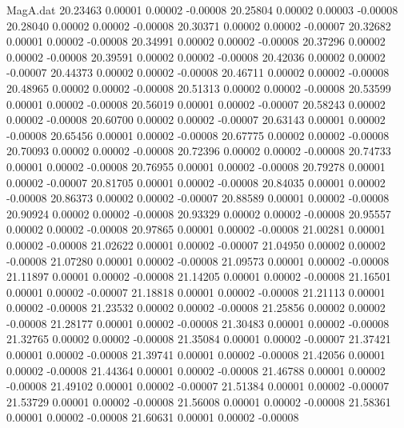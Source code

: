 \begin{filecontents}{MagA.dat}
  20.23463    0.00001    0.00002   -0.00008
  20.25804    0.00002    0.00003   -0.00008
  20.28040    0.00002    0.00002   -0.00008
  20.30371    0.00002    0.00002   -0.00007
  20.32682    0.00001    0.00002   -0.00008
  20.34991    0.00002    0.00002   -0.00008
  20.37296    0.00002    0.00002   -0.00008
  20.39591    0.00002    0.00002   -0.00008
  20.42036    0.00002    0.00002   -0.00007
  20.44373    0.00002    0.00002   -0.00008
  20.46711    0.00002    0.00002   -0.00008
  20.48965    0.00002    0.00002   -0.00008
  20.51313    0.00002    0.00002   -0.00008
  20.53599    0.00001    0.00002   -0.00008
  20.56019    0.00001    0.00002   -0.00007
  20.58243    0.00002    0.00002   -0.00008
  20.60700    0.00002    0.00002   -0.00007
  20.63143    0.00001    0.00002   -0.00008
  20.65456    0.00001    0.00002   -0.00008
  20.67775    0.00002    0.00002   -0.00008
  20.70093    0.00002    0.00002   -0.00008
  20.72396    0.00002    0.00002   -0.00008
  20.74733    0.00001    0.00002   -0.00008
  20.76955    0.00001    0.00002   -0.00008
  20.79278    0.00001    0.00002   -0.00007
  20.81705    0.00001    0.00002   -0.00008
  20.84035    0.00001    0.00002   -0.00008
  20.86373    0.00002    0.00002   -0.00007
  20.88589    0.00001    0.00002   -0.00008
  20.90924    0.00002    0.00002   -0.00008
  20.93329    0.00002    0.00002   -0.00008
  20.95557    0.00002    0.00002   -0.00008
  20.97865    0.00001    0.00002   -0.00008
  21.00281    0.00001    0.00002   -0.00008
  21.02622    0.00001    0.00002   -0.00007
  21.04950    0.00002    0.00002   -0.00008
  21.07280    0.00001    0.00002   -0.00008
  21.09573    0.00001    0.00002   -0.00008
  21.11897    0.00001    0.00002   -0.00008
  21.14205    0.00001    0.00002   -0.00008
  21.16501    0.00001    0.00002   -0.00007
  21.18818    0.00001    0.00002   -0.00008
  21.21113    0.00001    0.00002   -0.00008
  21.23532    0.00002    0.00002   -0.00008
  21.25856    0.00002    0.00002   -0.00008
  21.28177    0.00001    0.00002   -0.00008
  21.30483    0.00001    0.00002   -0.00008
  21.32765    0.00002    0.00002   -0.00008
  21.35084    0.00001    0.00002   -0.00007
  21.37421    0.00001    0.00002   -0.00008
  21.39741    0.00001    0.00002   -0.00008
  21.42056    0.00001    0.00002   -0.00008
  21.44364    0.00001    0.00002   -0.00008
  21.46788    0.00001    0.00002   -0.00008
  21.49102    0.00001    0.00002   -0.00007
  21.51384    0.00001    0.00002   -0.00007
  21.53729    0.00001    0.00002   -0.00008
  21.56008    0.00001    0.00002   -0.00008
  21.58361    0.00001    0.00002   -0.00008
  21.60631    0.00001    0.00002   -0.00008

\end{filecontents}
